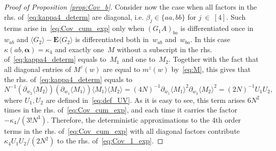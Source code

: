 \documentclass[10pt]{amsart}
\numberwithin{equation}{section}
\newcommand{\E}{\mathbf{E}}
\begin{document}
\begin{proof}[Proof of Proposition \ref{prop:Cov_b}]
Consider now the case when all factors in the rhs. of~\eqref{eq:kappa4_determ} are diagonal, i.e. $\beta_j\in\{aa,bb\}$ for $j~\!\in~\![4]$. Such terms arise in~\eqref{eq:Cov_cum_exp} only when $(G_1A)_{ba}$ is differentiated once in~$w_{ab}$ and $\langle G_2\rangle-\E\langle G_2\rangle$ is differentiated both in~$w_{ab}$ and~$w_{ba}$. In this case $\kappa(ab,\bm{\alpha})=\kappa_4$ and exactly one~$M$ without a subscript in the rhs. of~\eqref{eq:kappa4_determ} equals to~$M_1$ and one to~$M_2$. Together with the fact that all diagonal entries of $M^z(w)$ are equal to $m^z(w)$ by~\eqref{eq:M}, this gives that the rhs. of~\eqref{eq:kappa4_determ} equals to
\begin{equation}
N^{-1} \left(\partial_{w_2}\langle M_2\rangle\right) \left(\partial_{w_1}\langle M_1\rangle\right) \langle M_1\rangle\langle M_2\rangle = (4N)^{-1} \partial_{w_1}\langle M_1\rangle^2\partial_{w_2}\langle M_2\rangle^2 = (2N)^{-1}U_1U_2,
\label{eq:kappa4_contrib} 
\end{equation}  
where $U_1,U_2$ are defined in~\eqref{eq:def_UV}. As it is easy to see, this term arises $6N^2$ times in the rhs. of~\eqref{eq:Cov_cum_exp}, and each time it carries the factor $-\kappa_4/(3!N^3)$. Therefore, the deterministic approximations to the 4th order terms in the rhs. of~\eqref{eq:Cov_cum_exp} with all diagonal factors contribute $\kappa_4U_1U_2/(2N^2)$ to the rhs. of~\eqref{eq:Cov_1_exp}.


\end{proof}
\end{document}
